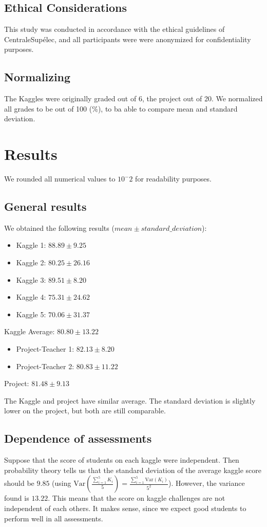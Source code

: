 \documentclass[a4paper]{article}
\newcommand{\Var}[1]{\text{Var}\left( {#1} \right)}
\begin{document}
	\subsection{Ethical Considerations}
	This study was conducted in accordance with the ethical guidelines of CentraleSupélec, and all participants were were anonymized for confidentiality purposes.
	
	\subsection{Normalizing}
	The Kaggles were originally graded out of 6, the project out of 20.
	We normalized all grades to be out of 100 (\%), to ba able to compare mean and standard deviation.
	
	\section{Results}
	We rounded all numerical values to $10^-2$ for readability purposes.
	\subsection{General results}
	We obtained the following results ($mean \pm standard\_deviation$):
	\begin{itemize}
		\item Kaggle 1: $88.89 \pm 9.25$
		\item Kaggle 2: $80.25 \pm 26.16$
		\item Kaggle 3: $89.51 \pm 8.20$
		\item Kaggle 4: $75.31 \pm 24.62$
		\item Kaggle 5: $70.06 \pm 31.37$
	\end{itemize}
	Kaggle Average: $80.80 \pm 13.22$
	\begin{itemize}
		\item Project-Teacher 1: $82.13 \pm 8.20$
		\item Project-Teacher 2: $80.83 \pm 11.22$
	\end{itemize}
	Project: $81.48 \pm 9.13$
	
	The Kaggle and project have similar average.
	The standard deviation is slightly lower on the project, but both are still comparable.
	
	\subsection{Dependence of assessments}
	Suppose that the score of students on each kaggle were independent.
	Then probability theory tells us that the standard deviation of the average kaggle score should be $9.85$ (using $\Var{\frac{\sum_{i=1}^{5} K_i}{5}} = \frac{\sum_{i=1}^{5} \Var{K_i}}{5^2}$).
	However, the variance found is $13.22$.
	This means that the score on kaggle challenges are not independent of each others.
	It makes sense, since we expect good students to perform well in all assessments.
	
\end{document}
